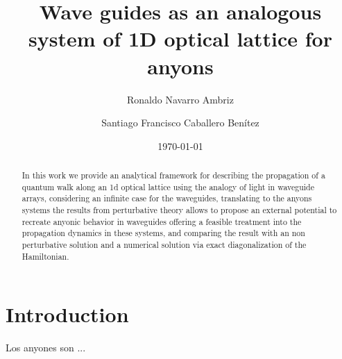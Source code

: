 \documentclass[a4paper, amsfonts, amssymb, amsmath, reprint, showkeys, nofootinbib ,twoside]{revtex4-2}
\begin{document}
\title{Wave guides as an analogous system of 1D optical lattice for anyons}

\author{Ronaldo Navarro Ambriz}
\author{Santiago Francisco Caballero Benítez}

\date{\today} %

\begin{abstract}
In this work we provide an analytical framework for describing the propagation of a quantum walk along an 1d optical lattice using the analogy of light in waveguide arrays, considering an infinite case for the waveguides, translating to the anyons systems the results from perturbative theory  allows to propose an external potential to recreate anyonic behavior in waveguides offering a feasible treatment into the propagation dynamics in these systems, and comparing the result with an non perturbative solution and a numerical solution via exact diagonalization of the Hamiltonian. 
\end{abstract}



\maketitle

%
\section{Introduction} 
Los anyones son ... 
\end{document}
